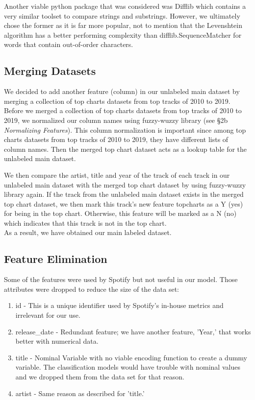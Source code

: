 \documentclass[12pt,journal]{IEEEtran}
\begin{document}
Another viable python package that was considered was Difflib which contains a very similar toolset to compare strings and substrings. However, we ultimately chose the former as it is far more popular, not to mention that the Levenshtein algorithm has a better performing complexity than difflib.SequenceMatcher for words that contain out-of-order characters.

\subsection{Merging Datasets}
We decided to add another feature (column) in our unlabeled main dataset by merging a collection of top charts datasets from top tracks of 2010 to 2019. Before we merged a collection of top charts datasets from top tracks of 2010 to 2019, we normalized our column names using fuzzy-wuzzy library (see \S2b \textit{Normalizing Features}). This column normalization is important since among top charts datasets from top tracks of 2010 to 2019, they have different lists of column names. Then the merged top chart dataset acts as a lookup table for the unlabeled main dataset.

We then compare the artist, title and year of the track of each track in our unlabeled main dataset with the merged top chart dataset by using fuzzy-wuzzy library again. If the track from the unlabeled main dataset exists in the merged top chart dataset, we then mark this track’s new feature topcharts as a Y (yes) for being in the top chart. Otherwise, this feature will be marked as a N (no) which indicates that this track is not in the top chart. \\

As a result, we have obtained our main labeled dataset.

\subsection{Feature Elimination}
Some of the features were used by Spotify but not useful in our model. Those attributes were dropped to reduce the size of the data set:\\
\begin{enumerate}
	\item id - This is a unique identifier used by Spotify's in-house metrics and irrelevant for our use.
	\item release\_date - Redundant feature; we have another feature, 'Year,' that works better with numerical data.
	\item title - Nominal Variable with no viable encoding function to create a dummy variable. The classification models would have trouble with nominal values and we dropped them from the data set for that reason.
	\item artist - Same reason as described for 'title.'
\end{enumerate}
\end{document}
